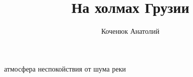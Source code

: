 \documentclass[12pt,a4paper]{article}
\author{Коченюк Анатолий}
\title{На холмах Грузии}
\begin{document}
\maketitle

атмосфера неспокойствия от шума реки
\end{document}
